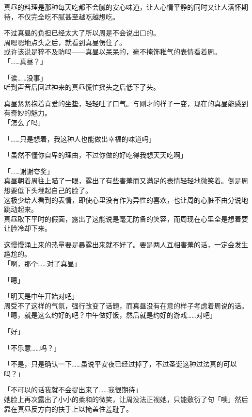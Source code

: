 真昼的料理是那种每天吃都不会腻的安心味道，让人心情平静的同时又让人满怀期待，不仅完全吃不腻甚至越吃越想吃。

不过真昼的负担已经太大了所以周是不会说出口的。\\

周嗯嗯地点头之后，就看到真昼愣住了。\\

或许该说是猝不及防吗——真昼以呆呆的，毫不掩饰稚气的表情看着周。\\

「……真昼？」

「诶……没事」\\

听到声音后回过神来的真昼慌忙摇头之后低下了头。

真昼紧紧抱着喜爱的坐垫，轻轻吐了口气。与刚才的样子一变，现在的真昼能感到有奇妙的魅力。\\

「怎么了吗」

「……只是想着，我这种人也能做出幸福的味道吗」

「虽然不懂你自卑的理由，不过你做的好吃得我想天天吃啊」

「……谢谢夸奖」\\

真昼朝着周往上瞄了一眼，露出了有些害羞而又满足的表情轻轻地微笑着。倒是周想要低下头埋起自己的脸了。\\

这极少给人看到的表情，即使心里没有作为异性的喜欢，也让周的心脏不由分说地跳动起来。\\

真昼取下平时的假面，露出了这能说是毫无防备的笑容，而周现在心里全是想着要让脸冷却下来。

这慢慢涌上来的热量要是暴露出来就不好了。要是两人互相害羞的话，一定会发生尴尬的。\\

「啊，那个……对了真昼」

「嗯」

「明天是中午开始对吧」\\

周受不了这样的气氛，强行改变了话题，而真昼没有在意的样子考虑着周说的话。\\

「嗯，就是这么约好的吧？中午做好饭，然后就是约好的游戏……对吧」

「好」

「不乐意……吗？」

「不是，只是确认一下……虽说平安夜已经过掉了，不过圣诞这种过法真的可以吗？」

「不可以的话我就不会提出来了……我很期待」\\

她脸上再次露出了小小的柔和的微笑，让周没法正视她，只能敷衍了句「噢」然后靠在真昼反方向的扶手上以掩盖住羞耻了。\\

